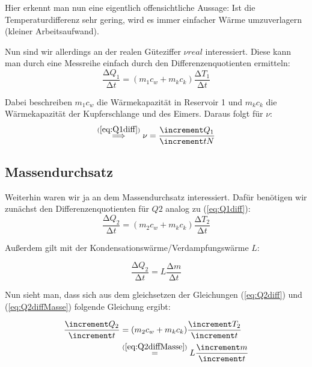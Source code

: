 Hier erkennt man nun eine eigentlich offensichtliche Aussage:
Ist die Temperaturdifferenz sehr gering, wird es immer einfacher Wärme umzuverlagern (kleiner Arbeitsaufwand).

Nun sind wir allerdings an der realen Güteziffer $\nu{real}$ interessiert.
Diese kann man durch eine Messreihe einfach durch den Differenzenquotienten ermitteln:
\begin{equation} \label{eq:Q1diff}
    \frac{\increment Q_{1}}{\increment t} = (m_{1} c_{w} + m_{k} c_{k}) \frac{\increment T_{1}}{\increment t}
\end{equation}

Dabei beschreiben $m_{1} c_{w}$ die Wärmekapazität in Reservoir 1 und $m_{k} c_{k}$ die Wärmekapazität der Kupferschlange und des Eimers.
Daraus folgt für $\nu$:
\begin{equation}
    \stackrel{(\ref{eq:Q1diff})}{\implies} \nu = \frac{\increment Q_{1}}{\increment t N}
\end{equation}

\subsection{Massendurchsatz}

Weiterhin waren wir ja an dem Massendurchsatz interessiert. Dafür benötigen wir zunächst den Differenzenquotienten für $Q{2}$ analog zu (\ref{eq:Q1diff}):
\begin{equation} \label{eq:Q2diff}
    \frac{\increment Q_{2}}{\increment t} = (m_{2} c_{w} + m_{k} c_{k}) \frac{\increment T_{2}}{\increment t}
\end{equation}

Außerdem gilt mit der Kondensationswärme/Verdampfungswärme $L$:

\begin{equation} \label{eq:Q2diffMasse}
    \frac{\increment Q_{2}}{\increment t} = L \frac{\increment m}{\increment t}
\end{equation}

Nun sieht man, dass sich aus dem gleichsetzen der Gleichungen (\ref{eq:Q2diff}) und (\ref{eq:Q2diffMasse}) folgende Gleichung ergibt:

\begin{align}
    \begin{split}
        \frac{\increment Q_{2}}{\increment t} & = (m_{2} c_{w} + m_{k} c_{k}) \frac{\increment T_{2}}{\increment t} \\
            & \stackrel{(\ref{eq:Q2diffMasse})}{=} L \frac{\increment m}{\increment t}
    \end{split}
\end{align}

